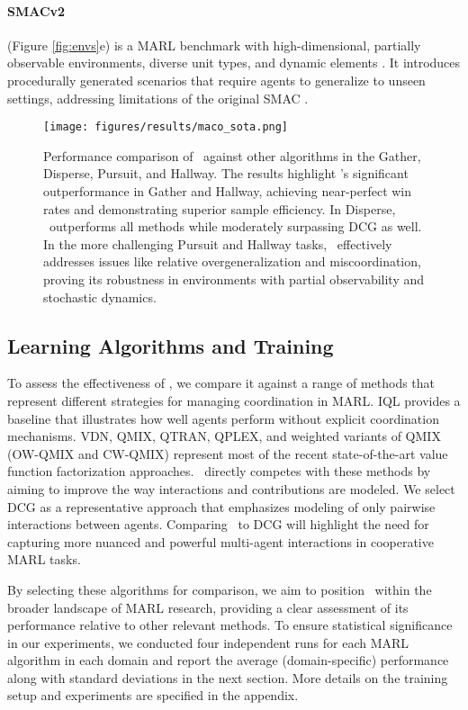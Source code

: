 \paragraph{SMACv2} (Figure \ref{fig:envs}e) is a MARL benchmark with high-dimensional, partially observable environments, diverse unit types, and dynamic elements \cite{ellis2023smacv}. It introduces procedurally generated scenarios that require agents to generalize to unseen settings, addressing limitations of the original SMAC \cite{samvelyan2019starcraft}. 

\begin{figure*}[!htp]
    \centering
    \texttt{[image: figures/results/maco\_sota.png]} 
    \caption{Performance comparison of \algoabb\ against other algorithms in the Gather, Disperse, Pursuit, and Hallway. The results highlight \algoabb's significant outperformance in Gather and Hallway, achieving near-perfect win rates and demonstrating superior sample efficiency. In Disperse, \algoabb\ outperforms all methods while moderately surpassing DCG as well. In the more challenging Pursuit and Hallway tasks, \algoabb\ effectively addresses issues like relative overgeneralization and miscoordination, proving its robustness in environments with partial observability and stochastic dynamics.} 
    \label{fig:res:maco_sota}
\end{figure*}


\subsection{Learning Algorithms and Training} 

To assess the effectiveness of \algoabb, we compare it against a range of methods that represent different strategies for managing coordination in MARL. IQL provides a baseline that illustrates how well agents perform without explicit coordination mechanisms. VDN, QMIX, QTRAN, QPLEX, and weighted variants of QMIX (OW-QMIX and CW-QMIX) represent most of the recent state-of-the-art value function factorization approaches. \algoabb\ directly competes with these methods by aiming to improve the way interactions and contributions are modeled. We select DCG as a representative approach that emphasizes modeling of only pairwise interactions between agents. Comparing \algoabb\ to DCG will highlight the need for capturing more nuanced and powerful multi-agent interactions in cooperative MARL tasks. 

By selecting these algorithms for comparison, we aim to position \algoabb\ within the broader landscape of MARL research, providing a clear assessment of its performance relative to other relevant methods. To ensure statistical significance in our experiments, we conducted four independent runs for each MARL algorithm in each domain and report the average (domain-specific) performance along with standard deviations in the next section. More details on the training setup and experiments are specified in the appendix. 

